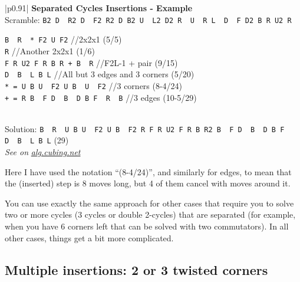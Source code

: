\documentclass[11pt,a4paper]{book}
\newcommand{\p}{\textquotesingle}
\newcommand{\m}{\texttt}
\newcommand{\ps}{\p\,\,}
\newcommand{\comment}[1]{{\color{gray}\quad//#1}}
\begin{document}
\bigskip
\begin{tabular}{|p{}|}
\hline
\textbf{Separated Cycles Insertions - Example}\\
\hline
Scramble: \m{B2 D\ps R2 D\ps F2 R2 D B2 U\ps L2 D2 R\ps U\ps R L\ps D\ps F D2 B R U2 R\p}\\
\hline
\begin{minipage}[l]{0.650\textwidth}
\m{B\ps R\ps * F2 U F2} \comment{2x2x1 (5/5)}\\
\m R \comment{Another 2x2x1 (1/6)}\\
\m{F R U2 F R B R + B\ps R} \comment{F2L-1 + pair (9/15)}\\
\m{D\ps B\ps L B L\p} \comment{All but 3 edges and 3 corners (5/20)}\\
\m{* = U B U\ps F2 U B\ps U\ps F2} \comment{3 corners (8-4/24)}\\
\m{+ = R B\ps F D\ps B\ps D B F\ps R\ps B} \comment{3 edges (10-5/29)}
\end{minipage}
\begin{minipage}[c]{0.25\textwidth}

\end{minipage}\\
\hline
Solution: \m{B\ps R\ps U B U\ps F2 U B\ps F2 R F R U2 F R B R2 B\ps F D\ps B\ps D B F\ps D\ps B\ps L B L\p} (29)\\
\hline
\emph{See on }\href{https://alg.cubing.net/?alg=B-_R-_(U_B_U-_F2_U_B-_U-_F2)_F2_U_F2_\%2F\%2F2x2x1_(5\%2F5)\%0AR_\%2F\%2FAnother_2x2x1_(1\%2F6)\%0AF_R_U2_F_R_B_R_(R_B-_F_D-_B-_D_B_F-_R-_B)_B-_R_\%2F\%2FF2L\%26\%2345\%3B1_\%26\%232b\%3B_pair_(9\%2F15)\%0AD-_B-_L_B_L-_\%2F\%2FAll_but_3_edges_and_3_corners_(5\%2F20)\%0A\%0A&setup=B2_D-_R2_D-_F2_R2_D_B2_U-_L2_D2_R-_U-_R_L-_D-_F_D2_B_R_U2_R-}{\emph{alg.cubing.net}}\\
\hline
\end{tabular}
\bigskip

Here I have used the notation ``(8-4/24)'', and similarly for edges, to mean that the (inserted) step is 8 moves long, but 4 of them cancel with moves around it.

You can use exactly the same approach for other cases that require you to solve two or more cycles (3 cycles or double 2-cycles) that are separated (for example, when you have 6 corners left that can be solved with two commutators). In all other cases, things get a bit more complicated.

\subsection{Multiple insertions: 2 or 3 twisted corners}
\end{document}
